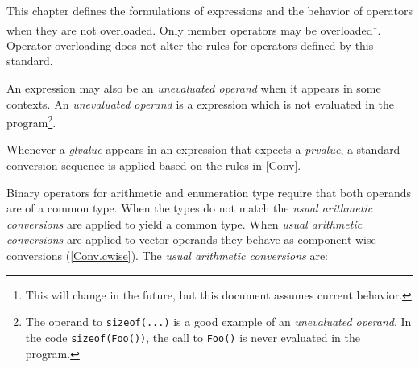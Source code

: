 
\p This chapter defines the formulations of expressions and the behavior of
operators when they are not overloaded. Only member operators may be
overloaded\footnote{This will change in the future, but this document assumes
current behavior.}. Operator overloading does not alter the rules for operators
defined by this standard.

\p An expression may also be an \textit{unevaluated operand} when it appears in
some contexts. An \textit{unevaluated operand} is a expression which is not
evaluated in the program\footnote{The operand to \texttt{sizeof(...)} is a good
example of an \textit{unevaluated operand}. In the code \texttt{sizeof(Foo())},
the call to \texttt{Foo()} is never evaluated in the program.}.

\p Whenever a \textit{glvalue} appears in an expression that expects a
\textit{prvalue}, a standard conversion sequence is applied based on the rules
in \ref{Conv}.

\p Binary operators for arithmetic and enumeration type require that both
operands are of a common type. When the types do not match the \textit{usual
arithmetic conversions} are applied to yield a common type. When \textit{usual
arithmetic conversions} are applied to vector operands they behave as
component-wise conversions (\ref{Conv.cwise}). The \textit{usual arithmetic
conversions} are:

